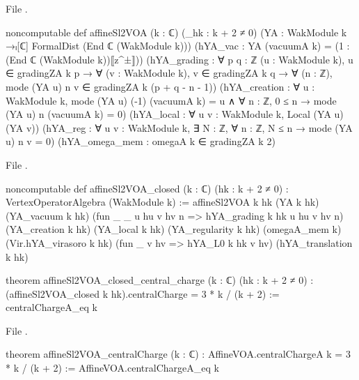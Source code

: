 \noindent File .
\begin{leancode}
noncomputable def affineSl2VOA (k : ℂ) (_hk : k + 2 ≠ 0)
    (YA : WakModule k →ₗ[ℂ] FormalDist (End ℂ (WakModule k)))
    (hYA_vac : YA (vacuumA k) = (1 : (End ℂ (WakModule k))⟦z^±⟧))
    (hYA_grading : ∀ {p q : ℤ} (u : WakModule k), u ∈ gradingZA k p →
        ∀ (v : WakModule k), v ∈ gradingZA k q → ∀ (n : ℤ),
        mode (YA u) n v ∈ gradingZA k (p + q - n - 1))
    (hYA_creation : ∀ u : WakModule k,
        mode (YA u) (-1) (vacuumA k) = u ∧
          ∀ n : ℤ, 0 ≤ n → mode (YA u) n (vacuumA k) = 0)
    (hYA_local : ∀ u v : WakModule k, Local (YA u) (YA v))
    (hYA_reg : ∀ u v : WakModule k, ∃ N : ℤ, ∀ n : ℤ, N ≤ n → mode (YA u) n v = 0)
    (hYA_omega_mem : omegaA k ∈ gradingZA k 2)
\end{leancode}
\noindent File .
\begin{leancode}
noncomputable def affineSl2VOA_closed (k : ℂ) (hk : k + 2 ≠ 0) :
    VertexOperatorAlgebra (WakModule k) :=
  affineSl2VOA k hk (YA k hk) (YA_vacuum k hk)
    (fun {_ _} u hu v hv n => hYA_grading k hk u hu v hv n)
    (YA_creation k hk) (YA_local k hk) (YA_regularity k hk) (omegaA_mem k)
    (Vir.hYA_virasoro k hk) (fun {_} v hv => hYA_L0 k hk v hv) (hYA_translation k hk)

theorem affineSl2VOA_closed_central_charge (k : ℂ) (hk : k + 2 ≠ 0) :
    (affineSl2VOA_closed k hk).centralCharge = 3 * k / (k + 2) :=
  centralChargeA_eq k
\end{leancode}
\noindent File .
\begin{leancode}
theorem affineSl2VOA_centralCharge (k : ℂ) :
    AffineVOA.centralChargeA k = 3 * k / (k + 2) :=
  AffineVOA.centralChargeA_eq k
\end{leancode}

